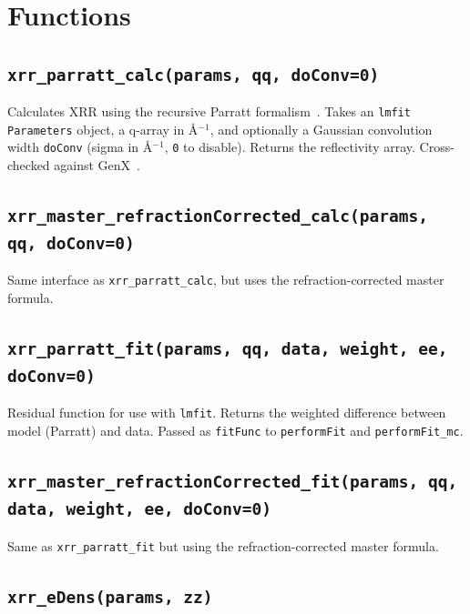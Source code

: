 \documentclass[11pt,a4paper]{article}
\begin{document}
\section{Functions}

\subsection*{\texttt{xrr\_parratt\_calc(params, qq, doConv=0)}}

Calculates XRR using the recursive Parratt formalism~\cite{Parratt1954}. Takes an
\texttt{lmfit} \texttt{Parameters} object, a q-array in \AA$^{-1}$, and optionally a
Gaussian convolution width \texttt{doConv} (sigma in \AA$^{-1}$, \texttt{0} to disable).
Returns the reflectivity array. Cross-checked against GenX~\cite{Bjorck2007}.

\subsection*{\texttt{xrr\_master\_refractionCorrected\_calc(params, qq, doConv=0)}}

Same interface as \texttt{xrr\_parratt\_calc}, but uses the refraction-corrected master formula.

\subsection*{\texttt{xrr\_parratt\_fit(params, qq, data, weight, ee, doConv=0)}}

Residual function for use with \texttt{lmfit}. Returns the weighted difference between
model (Parratt) and data. Passed as \texttt{fitFunc} to \texttt{performFit} and
\texttt{performFit\_mc}.

\subsection*{\texttt{xrr\_master\_refractionCorrected\_fit(params, qq, data, weight, ee, doConv=0)}}

Same as \texttt{xrr\_parratt\_fit} but using the refraction-corrected master formula.

\subsection*{\texttt{xrr\_eDens(params, zz)}}
\end{document}
